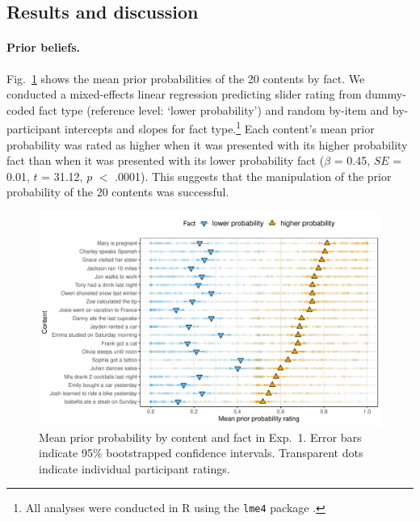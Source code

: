 \documentclass[11pt,fleqn]{article}
\newcommand{\figref}[1]{Fig.~\ref{#1}}
\newcommand{\6}{\mbox{$[\hspace*{-.6mm}[$}}
\newcommand{\9}{\mbox{$]\hspace*{-.6mm}]$}}
\begin{document}
\subsection{Results and discussion}

\paragraph{Prior beliefs.}  \figref{f-prior} shows the mean prior probabilities of the 20 contents by fact. We conducted a  mixed-effects linear regression predicting slider rating from dummy-coded fact type (reference level: `lower probability') and random by-item and by-participant intercepts and slopes for fact type.\footnote{All analyses were conducted in R \cite{R} using the \texttt{lme4} package \cite{lme4}.} Each content's mean prior probability  was rated as higher when it was presented with its higher probability fact than when it was presented with its lower probability fact ($\beta$ = 0.45, $SE$ = 0.01, $t$ = 31.12, $p$ $<$ .0001). This suggests that the manipulation of the prior probability of the 20 contents was successful. 

\begin{figure}[h!]
\centering
\includegraphics[width=.7\paperwidth]{../../results/9-prior-projection/graphs/prior-ratings}

\caption{Mean prior probability by content and fact in Exp.~1. Error bars indicate 95\% bootstrapped confidence intervals. Transparent dots indicate individual participant ratings.} 
\label{f-prior}
\end{figure}
\end{document}
